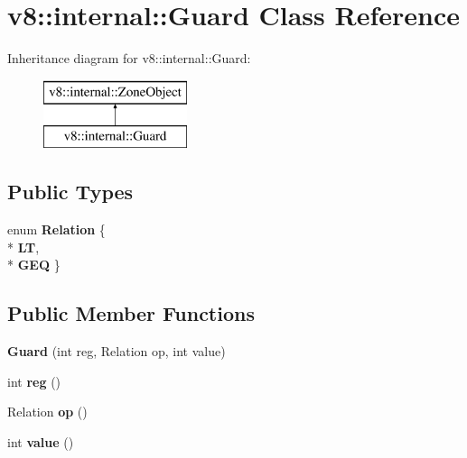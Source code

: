 \hypertarget{classv8_1_1internal_1_1_guard}{}\section{v8\+:\+:internal\+:\+:Guard Class Reference}
\label{classv8_1_1internal_1_1_guard}
Inheritance diagram for v8\+:\+:internal\+:\+:Guard\+:\begin{figure}[H]
\begin{center}
\leavevmode
\includegraphics[height=2.000000cm]{classv8_1_1internal_1_1_guard}
\end{center}
\end{figure}
\subsection*{Public Types}
\begin{DoxyCompactItemize}
\item 
enum {\bfseries Relation} \{ \\*
{\bfseries LT}, 
\\*
{\bfseries G\+EQ}
 \}\hypertarget{classv8_1_1internal_1_1_guard_a44b79b60fa04620a19805724d7372284}{}\label{classv8_1_1internal_1_1_guard_a44b79b60fa04620a19805724d7372284}

\end{DoxyCompactItemize}
\subsection*{Public Member Functions}
\begin{DoxyCompactItemize}
\item 
{\bfseries Guard} (int reg, Relation op, int value)\hypertarget{classv8_1_1internal_1_1_guard_a1852d4717d48fa87b5cc7cac576dd56d}{}\label{classv8_1_1internal_1_1_guard_a1852d4717d48fa87b5cc7cac576dd56d}

\item 
int {\bfseries reg} ()\hypertarget{classv8_1_1internal_1_1_guard_adc12b180ae664af6f07fdc95c9f7c4a3}{}\label{classv8_1_1internal_1_1_guard_adc12b180ae664af6f07fdc95c9f7c4a3}

\item 
Relation {\bfseries op} ()\hypertarget{classv8_1_1internal_1_1_guard_a5333a5b7ae284bfecb111dd6b1e59463}{}\label{classv8_1_1internal_1_1_guard_a5333a5b7ae284bfecb111dd6b1e59463}

\item 
int {\bfseries value} ()\hypertarget{classv8_1_1internal_1_1_guard_aaa76818527880f43a2bb9b7e9aa03fe1}{}\label{classv8_1_1internal_1_1_guard_aaa76818527880f43a2bb9b7e9aa03fe1}

\end{DoxyCompactItemize}

